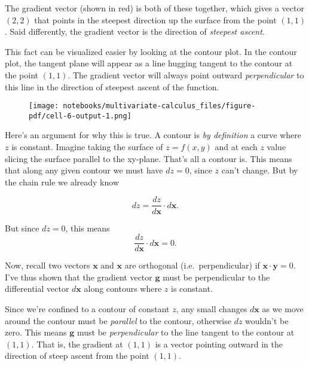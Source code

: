 \documentclass[
  letterpaper,
  DIV=11,
  numbers=noendperiod]{scrreprt}
\newenvironment{Shaded}{\begin{snugshade}}{\end{snugshade}}
\newcommand{\NormalTok}[1]{\textcolor[rgb]{0.00,0.23,0.31}{#1}}
\newcommand{\OperatorTok}[1]{\textcolor[rgb]{0.37,0.37,0.37}{#1}}
\newcommand{\SpecialCharTok}[1]{\textcolor[rgb]{0.37,0.37,0.37}{#1}}
\newcommand{\SpecialStringTok}[1]{\textcolor[rgb]{0.13,0.47,0.30}{#1}}
\begin{document}
The gradient vector (shown in red) is both of these together, which
gives a vector \((2, 2)\) that points in the steepest direction up the
surface from the point \((1,1)\). Said differently, the gradient vector
is the direction of \emph{steepest ascent}.

This fact can be visualized easier by looking at the contour plot. In
the contour plot, the tangent plane will appear as a line hugging
tangent to the contour at the point \((1,1)\). The gradient vector will
always point outward \emph{perpendicular} to this line in the direction
of steepest ascent of the function.

\begin{Shaded}
\end{Shaded}

\begin{figure}[H]

{\centering \texttt{[image: notebooks/multivariate-calculus\_files/figure-pdf/cell-6-output-1.png]}

}

\end{figure}

Here's an argument for why this is true. A contour is \emph{by
definition} a curve where \(z\) is constant. Imagine taking the surface
of \(z=f(x,y)\) and at each \(z\) value slicing the surface parallel to
the xy-plane. That's all a contour is. This means that along any given
contour we must have \(dz=0\), since \(z\) can't change. But by the
chain rule we already know

\[dz = \frac{dz}{d\mathbf{x}} \cdot d\mathbf{x}.\]

But since \(dz=0\), this means
\[\frac{dz}{d\mathbf{x}} \cdot d\mathbf{x} = 0.\]

Now, recall two vectors \(\mathbf{x}\) and \(\mathbf{x}\) are orthogonal
(i.e.~perpendicular) if \(\mathbf{x} \cdot \mathbf{y} = 0\). I've thus
shown that the gradient vector \(\mathbf{g}\) must be perpendicular to
the differential vector \(d\mathbf{x}\) along contours where \(z\) is
constant.

Since we're confined to a contour of constant \(z\), any small changes
\(d\mathbf{x}\) as we move around the contour must be \emph{parallel} to
the contour, otherwise \(dz\) wouldn't be zero. This means
\(\mathbf{g}\) must be \emph{perpendicular} to the line tangent to the
contour at \((1,1)\). That is, the gradient at \((1,1)\) is a vector
pointing outward in the direction of steep ascent from the point
\((1,1)\).
\end{document}
